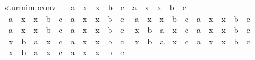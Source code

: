 \begin{isabellebody}
%
\endisadelimproof
\isanewline
{}\isamarkupfalse%
\ sturm{\isacharunderscore}imp{\isacharunderscore}conv{\isacharcolon}\ \isanewline
\ \ {\isachardoublequoteopen}{\isacharparenleft}a\ {\isacharless}\ x\ {\isasymlongrightarrow}\ x\ {\isacharless}\ b\ {\isasymlongrightarrow}\ c{\isacharparenright}\ {\isasymlongleftrightarrow}\ {\isacharparenleft}a\ {\isacharless}\ x\ {\isasymand}\ x\ {\isacharless}\ b\ {\isasymlongrightarrow}\ c{\isacharparenright}{\isachardoublequoteclose}\isanewline
\ \ {\isachardoublequoteopen}{\isacharparenleft}a\ {\isasymle}\ x\ {\isasymlongrightarrow}\ x\ {\isacharless}\ b\ {\isasymlongrightarrow}\ c{\isacharparenright}\ {\isasymlongleftrightarrow}\ {\isacharparenleft}a\ {\isasymle}\ x\ {\isasymand}\ x\ {\isacharless}\ b\ {\isasymlongrightarrow}\ c{\isacharparenright}{\isachardoublequoteclose}\isanewline
\ \ {\isachardoublequoteopen}{\isacharparenleft}a\ {\isacharless}\ x\ {\isasymlongrightarrow}\ x\ {\isasymle}\ b\ {\isasymlongrightarrow}\ c{\isacharparenright}\ {\isasymlongleftrightarrow}\ {\isacharparenleft}a\ {\isacharless}\ x\ {\isasymand}\ x\ {\isasymle}\ b\ {\isasymlongrightarrow}\ c{\isacharparenright}{\isachardoublequoteclose}\isanewline
\ \ {\isachardoublequoteopen}{\isacharparenleft}a\ {\isasymle}\ x\ {\isasymlongrightarrow}\ x\ {\isasymle}\ b\ {\isasymlongrightarrow}\ c{\isacharparenright}\ {\isasymlongleftrightarrow}\ {\isacharparenleft}a\ {\isasymle}\ x\ {\isasymand}\ x\ {\isasymle}\ b\ {\isasymlongrightarrow}\ c{\isacharparenright}{\isachardoublequoteclose}\isanewline
\ \ {\isachardoublequoteopen}{\isacharparenleft}x\ {\isacharless}\ b\ {\isasymlongrightarrow}\ a\ {\isacharless}\ x\ {\isasymlongrightarrow}\ c{\isacharparenright}\ {\isasymlongleftrightarrow}\ {\isacharparenleft}a\ {\isacharless}\ x\ {\isasymand}\ x\ {\isacharless}\ b\ {\isasymlongrightarrow}\ c{\isacharparenright}{\isachardoublequoteclose}\isanewline
\ \ {\isachardoublequoteopen}{\isacharparenleft}x\ {\isacharless}\ b\ {\isasymlongrightarrow}\ a\ {\isasymle}\ x\ {\isasymlongrightarrow}\ c{\isacharparenright}\ {\isasymlongleftrightarrow}\ {\isacharparenleft}a\ {\isasymle}\ x\ {\isasymand}\ x\ {\isacharless}\ b\ {\isasymlongrightarrow}\ c{\isacharparenright}{\isachardoublequoteclose}\isanewline
\ \ {\isachardoublequoteopen}{\isacharparenleft}x\ {\isasymle}\ b\ {\isasymlongrightarrow}\ a\ {\isacharless}\ x\ {\isasymlongrightarrow}\ c{\isacharparenright}\ {\isasymlongleftrightarrow}\ {\isacharparenleft}a\ {\isacharless}\ x\ {\isasymand}\ x\ {\isasymle}\ b\ {\isasymlongrightarrow}\ c{\isacharparenright}{\isachardoublequoteclose}\isanewline
\ \ {\isachardoublequoteopen}{\isacharparenleft}x\ {\isasymle}\ b\ {\isasymlongrightarrow}\ a\ {\isasymle}\ x\ {\isasymlongrightarrow}\ c{\isacharparenright}\ {\isasymlongleftrightarrow}\ {\isacharparenleft}a\ {\isasymle}\ x\ {\isasymand}\ x\ {\isasymle}\ b\ {\isasymlongrightarrow}\ c{\isacharparenright}{\isachardoublequoteclose}\isanewline

\end{isabellebody}
